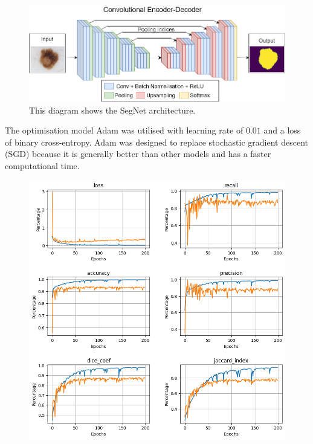 \begin{figure}[]
    \centering
    \includegraphics[scale=0.5]{images/segmentation/segnet-arch.png}
    \caption{This diagram shows the SegNet architecture.}\label{SegNet-arch}
\end{figure}

The optimisation model Adam was utilised with learning rate of $0.01$ and a loss of binary cross-entropy. Adam was designed to replace stochastic gradient descent (SGD) because it is generally better than other models and has a faster computational time. 

\begin{figure}[]
    \centering
    \includegraphics[scale=0.7]{images/segmentation/SegNet-results.png}
    \caption{}\label{SegNet-results}
\end{figure}

